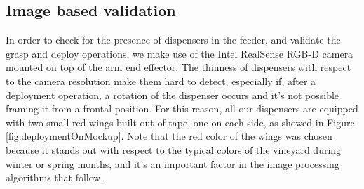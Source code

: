 \subsection{Image based validation}\label{subsec:imageBasedValidationSec}
In order to check for the presence of dispensers in the feeder, and validate the grasp and deploy operations, we make use of the Intel RealSense RGB-D camera mounted on top of the arm end effector. The thinness of dispensers with respect to the camera resolution make them hard to detect, especially if, after a deployment operation, a rotation of the dispenser occurs and it's not possible framing it from a frontal position. For this reason, all our dispensers are equipped with two small red wings built out of tape, one on each side, as showed in Figure \ref{fig:deploymentOnMockup}. Note that the red color of the wings was chosen because it stands out with respect to the typical colors of the vineyard during winter or spring months, and it's an important factor in the image processing algorithms that follow. 

